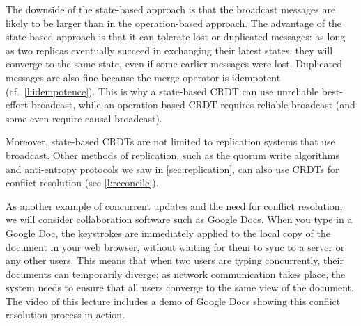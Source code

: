 The downside of the state-based approach is that the broadcast messages are likely to be larger than in the operation-based approach.
The advantage of the state-based approach is that it can tolerate lost or duplicated messages: as long as two replicas eventually succeed in exchanging their latest states, they will converge to the same state, even if some earlier messages were lost.
Duplicated messages are also fine because the merge operator is idempotent (cf.\ \autoref{l:idempotence}).
This is why a state-based CRDT can use unreliable best-effort broadcast, while an operation-based CRDT requires reliable broadcast (and some even require causal broadcast).

Moreover, state-based CRDTs are not limited to replication systems that use broadcast.
Other methods of replication, such as the quorum write algorithms and anti-entropy protocols we saw in \autoref{sec:replication}, can also use CRDTs for conflict resolution (see \autoref{l:reconcile}).

As another example of concurrent updates and the need for conflict resolution, we will consider collaboration software such as Google Docs.
When you type in a Google Doc, the keystrokes are immediately applied to the local copy of the document in your web browser, without waiting for them to sync to a server or any other users.
This means that when two users are typing concurrently, their documents can temporarily diverge; as network communication takes place, the system needs to ensure that all users converge to the same view of the document.
The video of this lecture includes a demo of Google Docs showing this conflict resolution process in action.

\begin{frame}[plain]
    \label{s:google-docs}
\end{frame}
\label{l:google-docs}

